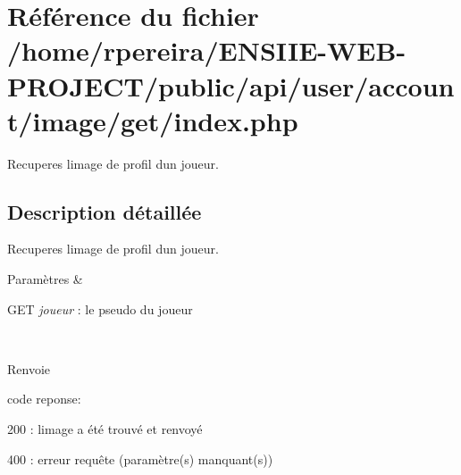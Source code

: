 \hypertarget{account_2image_2get_2index_8php}{}\section{Référence du fichier /home/rpereira/\+E\+N\+S\+I\+I\+E-\/\+W\+E\+B-\/\+P\+R\+O\+J\+E\+C\+T/public/api/user/account/image/get/index.php}
\label{account_2image_2get_2index_8php}


Recuperes l\textquotesingle{}image de profil d\textquotesingle{}un joueur.  




\subsection{Description détaillée}
Recuperes l\textquotesingle{}image de profil d\textquotesingle{}un joueur. 


\begin{DoxyParams}{Paramètres}
{\em } & 
\begin{DoxyItemize}
\item G\+ET {\itshape joueur} \+: le pseudo du joueur 
\end{DoxyItemize}\\
\hline
\end{DoxyParams}
\begin{DoxyReturn}{Renvoie}

\begin{DoxyItemize}
\item code reponse\+:
\begin{DoxyItemize}
\item 200 \+: l\textquotesingle{}image a été trouvé et renvoyé
\item 400 \+: erreur requête (paramètre(s) manquant(s)) 
\end{DoxyItemize}
\end{DoxyItemize}
\end{DoxyReturn}
